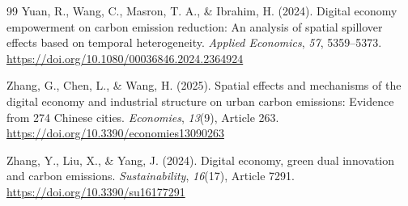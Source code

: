 \documentclass[economies,article,submit,moreauthors]{Definitions/mdpi}
\begin{document}
\begin{thebibliography}{99}
Yuan, R., Wang, C., Masron, T. A., \& Ibrahim, H. (2024). Digital economy empowerment on carbon emission reduction: An analysis of spatial spillover effects based on temporal heterogeneity. \textit{Applied Economics}, \textit{57}, 5359--5373. \url{https://doi.org/10.1080/00036846.2024.2364924}

Zhang, G., Chen, L., \& Wang, H. (2025). Spatial effects and mechanisms of the digital economy and industrial structure on urban carbon emissions: Evidence from 274 Chinese cities. \textit{Economies}, \textit{13}(9), Article 263. \url{https://doi.org/10.3390/economies13090263}

Zhang, Y., Liu, X., \& Yang, J. (2024). Digital economy, green dual innovation and carbon emissions. \textit{Sustainability}, \textit{16}(17), Article 7291. \url{https://doi.org/10.3390/su16177291}

\end{thebibliography}
\end{document}
